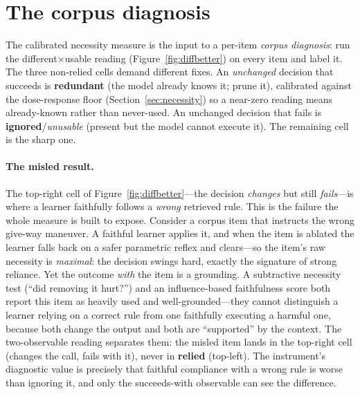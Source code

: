 \documentclass{article}
\begin{document}
\section{The corpus diagnosis}
\label{sec:diagnosis}
The calibrated necessity measure is the input to a per-item \emph{corpus diagnosis}: run the
different$\times$usable reading (Figure~\ref{fig:diffbetter}) on every item and label it. The three
non-relied cells demand different fixes. An \emph{unchanged} decision that succeeds is \textbf{redundant}
(the model already knows it; prune it), calibrated against the dose-response floor
(Section~\ref{sec:necessity}) so a near-zero reading means already-known rather than never-used. An
unchanged decision that fails is \textbf{ignored}/\emph{unusable} (present but the model cannot execute
it). The remaining cell is the sharp one.

\paragraph{The misled result.} The top-right cell of Figure~\ref{fig:diffbetter}---the decision
\emph{changes} but still \emph{fails}---is where a learner faithfully follows a \emph{wrong} retrieved
rule. This is the failure the whole measure is built to expose. Consider a corpus item that instructs
the wrong give-way maneuver. A faithful learner applies it, and when the item is ablated the learner
falls back on a safer parametric reflex and clears---so the item's raw necessity is \emph{maximal}: the
decision swings hard, exactly the signature of strong reliance. Yet the outcome \emph{with} the item is
a grounding. A subtractive necessity test (``did removing it hurt?'') and an influence-based
faithfulness score both report this item as heavily used and well-grounded---they cannot distinguish a
learner relying on a correct rule from one faithfully executing a harmful one, because both change the
output and both are ``supported'' by the context. The two-observable reading separates them: the
misled item lands in the top-right cell (changes the call, fails with it), never in \textbf{relied}
(top-left). The instrument's diagnostic value is precisely that faithful compliance with a wrong rule
is worse than ignoring it, and only the succeeds-with observable can see the difference.
\end{document}
